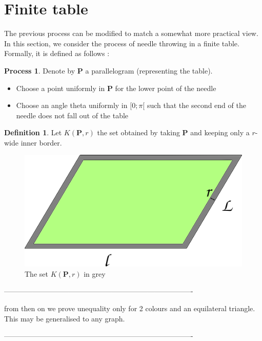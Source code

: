\documentclass[a4paper,11pt]{article}
\theoremstyle{definition}
\newtheorem{definition}{Definition}
\newtheorem{process}{Process}
\theoremstyle{remark}
\begin{document}
\section{Finite table} \label{fini}

The previous process can be modified to match a somewhat more practical view. 
In this section, we consider the process of needle throwing in a finite table. 
Formally, it is defined as follows :


\begin{process}
Denote by $\mathbf{P}$ a parallelogram (representing the table). 
\begin{itemize}
\item Choose a point uniformly in $\mathbf{P}$ for the lower point of the needle
\item Choose an angle theta uniformly in $[0 ; \pi[$ such that the second end 
of the needle does not fall out of the table
\end{itemize}
\end{process}

\begin{definition}
Let $K(\mathbf{P},r)$ the set obtained by taking $\mathbf{P}$ 
and keeping only a $r$-wide inner border.
\end{definition}

\begin{figure}[h]
\center
\includegraphics[scale=0.5]{tablefinie.png}
\caption{\label{tablefinie} The set $K(\mathbf{P},r)$ in grey}
\end{figure}

-------------------------------------------------------------------------------

from then on we prove unequality only for 2 colours and an equilateral
triangle. This may be generalised to any graph.

-------------------------------------------------------------------------------
\end{document}
